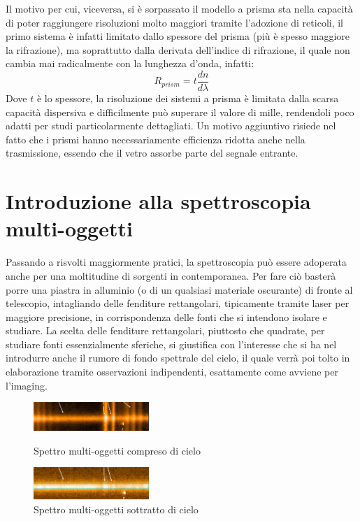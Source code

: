 Il motivo per cui, viceversa, si è sorpassato il modello a prisma sta nella capacità di poter raggiungere risoluzioni molto maggiori tramite l'adozione di reticoli, il primo sistema è infatti limitato dallo spessore del prisma (più è spesso maggiore la rifrazione), ma soprattutto dalla derivata dell'indice di rifrazione, il quale non cambia mai radicalmente con la lunghezza d'onda, infatti:
\begin{equation*}
    R_{prism}=t\frac{dn}{d\lambda}
\end{equation*}
Dove $t$ è lo spessore, la risoluzione dei sistemi a prisma è limitata dalla scarsa capacità dispersiva e difficilmente può superare il valore di mille, rendendoli poco adatti per studi particolarmente dettagliati. Un motivo aggiuntivo risiede nel fatto che i prismi hanno necessariamente efficienza ridotta anche nella trasmissione, essendo che il vetro assorbe parte del segnale entrante.

\section{Introduzione alla spettroscopia multi-oggetti}

Passando a risvolti maggiormente pratici, la spettroscopia può essere adoperata anche per una moltitudine di sorgenti in contemporanea. Per fare ciò basterà porre una piastra in alluminio (o di un qualsiasi materiale oscurante) di fronte al telescopio, intagliando delle fenditure rettangolari, tipicamente tramite laser per maggiore precisione, in corrispondenza delle fonti che si intendono isolare e studiare. La scelta delle fenditure rettangolari, piuttosto che quadrate, per studiare fonti essenzialmente sferiche, si giustifica con l'interesse che si ha nel introdurre anche il rumore di fondo spettrale del cielo, il quale verrà poi tolto in elaborazione tramite osservazioni indipendenti, esattamente come avviene per l'imaging.

\begin{figure}
    \centering
    \vspace{-10pt}
    \includegraphics[width=0.39\textwidth]{Immagini/Capitolo3/Spettro_multi_concielo.PNG}
    \vspace{-5pt}
    \caption*{Spettro multi-oggetti compreso di cielo}
    \vspace{+8pt}

    \includegraphics[width=0.39\textwidth]{Immagini/Capitolo3/Spettro_multi_senzacielo.PNG}
    \vspace{-5pt}
    \caption*{Spettro multi-oggetti sottratto di cielo}
    \vspace{-10pt}
\end{figure}

